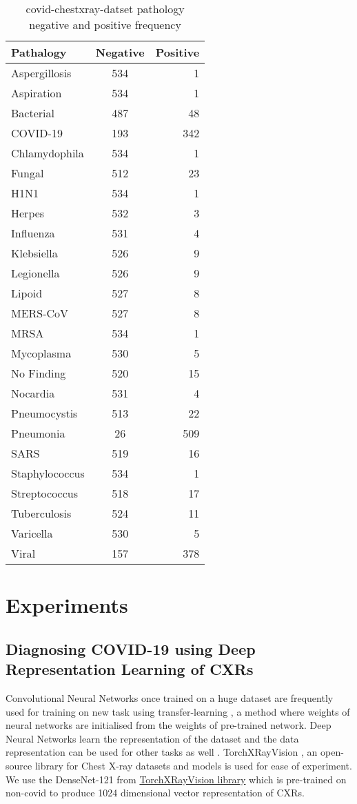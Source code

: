 \documentclass[a4paper]{article}
\begin{document}
\begin{table}[h]
\centering
\begin{tabular}{l|c|r}
Pathalogy & Negative & Positive  \\\hline

Aspergillosis &	534 &	1\\
Aspiration & 534 &	1\\
Bacterial & 487 &	48\\
COVID-19 & 193 & 342\\
Chlamydophila	& 534& 1\\
Fungal	&512     &23\\
H1N1	&534&	1\\
Herpes 	&532&	3\\
Influenza	&531&	4\\
Klebsiella&	526&	9\\
Legionella	&526&	9\\
Lipoid	&527	&8\\
MERS-CoV&	527&	8\\
MRSA	&534	&1\\
Mycoplasma&	530&	5\\
No Finding	&520&	15\\
Nocardia	&531&	4\\
Pneumocystis	&513&	22\\
Pneumonia	&26	&509\\
SARS	&519&	16\\
Staphylococcus&	534&	1\\
Streptococcus	&518&	17\\
Tuberculosis	&524&	11\\
Varicella	&530	&5\\
Viral	&157	&378\\

\end{tabular}
\caption{\label{tab:pathalogy-data}covid-chestxray-datset pathology negative and positive frequency}
\end{table}


\section{Experiments}

\subsection{Diagnosing COVID-19 using Deep Representation Learning of CXRs}

Convolutional Neural Networks once trained on a huge dataset are frequently used for training on new task using transfer-learning \cite{transferlearn}, a method where weights of neural networks are initialised from the weights of pre-trained network. Deep Neural Networks learn the representation of the dataset and the data representation can be used for other tasks as well \cite{representationlearn}.
TorchXRayVision \cite{Cohen2020xrv}, an open-source library for Chest X-ray datasets and models is used for ease of experiment.
We use the DenseNet-121 \cite{huang2018densely} from \href{https://github.com/mlmed/torchxrayvision}{TorchXRayVision library} which is pre-trained on non-covid to produce 1024 dimensional vector representation of CXRs. 
\end{document}
